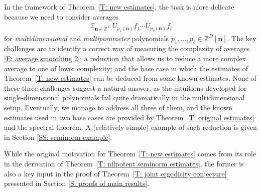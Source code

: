 \documentclass[11pt]{amsart}
\theoremstyle{definition}
\DeclareMathOperator*{\E}{\mathbb{E}}
\newcommand{\Z}{{\mathbb Z}}
\newcommand{\bn}{{\mathbf{n}}}
\newcommand{\1}{{\mathbf{1}}}
\begin{document}
In the framework of Theorem~\ref{T: new estimates}, the task is more delicate because we need to consider averages
\begin{align}\label{E: average smoothing 2}
    \E_{\bn\in\Z^{L}}U_{p_1(\bn)}f_1\cdots U_{p_\ell(\bn)}f_\ell
\end{align}
for \textit{multidimensional} and \textit{multiparameter} polynomials $p_1, \ldots, p_\ell\in\Z^D[\bn]$. The key challenges are to identify a correct way of measuring the complexity of averages \eqref{E: average smoothing 2}; a reduction that allows us to reduce a more complex average to one of lower complexity; and the base case in which the estimates of Theorem~\ref{T: new estimates} can be deduced from some known estimates. None of these three challenges suggest a natural answer, as the intuitions developed for single-dimensional polynomials fail quite dramatically in the multidimensional setup. Eventually, we manage to address all three of them, and the known estimates used in two base cases are provided by Theorem~\ref{T: original estimates} and the spectral theorem. A (relatively simple) example of such reduction is given in Section \ref{SS: seminorm example}. 

While the original motivation for Theorem~\ref{T: new estimates} comes from its role in the derivation of Theorem~\ref{T: nilpotent seminorm estimates}, the former is also a key input in the proof of Theorem~\ref{T: joint ergodicity conjecture} presented in Section \ref{S: proofs of main results}.
\end{document}

